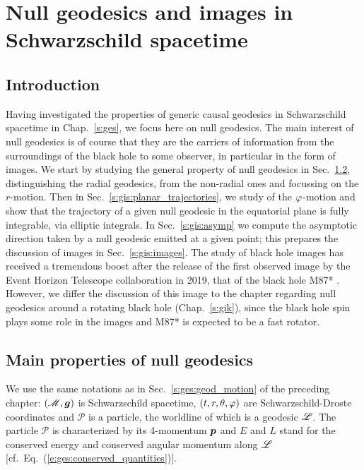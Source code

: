 \chapter{Null geodesics and images in Schwarzschild spacetime}
\label{s:gis}

\minitoc

\section{Introduction} \label{s:gis:intro}

Having investigated the properties of generic causal geodesics
in Schwarzschild spacetime in Chap.~\ref{s:ges}, we focus here on null
geodesics. The main interest of null geodesics is of course that they are
the carriers of information from the surroundings of the black hole to some
observer, in particular in the form of images.
We start by studying the general property of null geodesics in
Sec.~\ref{s:gis:null}, distinguishing the radial geodesics, from the non-radial
ones and focussing on the $r$-motion. Then in Sec.~\ref{s:gis:planar_trajectories},
we study of the $\varphi$-motion and show that the trajectory of a given
null geodesic in the equatorial plane is fully integrable, via elliptic integrals.
In Sec.~\ref{s:gis:asymp} we compute the asymptotic direction taken by a
null geodesic emitted at a given point; this prepares the discussion of
images in Sec.~\ref{s:gis:images}.
The study of black hole images has received a tremendous boost after the release of the first observed image by the Event Horizon Telescope collaboration in 2019, that of the black hole M87* \cite{EHT19a}.
However, we differ the discussion of this image to the chapter regarding null
geodesics around a rotating black hole (Chap.~\ref{s:gik}), since the black hole
spin plays some role in the images and M87* is expected to be a fast rotator.




\section{Main properties of null geodesics} \label{s:gis:null}

We use the same notations as in Sec.~\ref{s:ges:geod_motion} of the preceding
chapter: $(\mathscr{M}, \bm{g})$ is Schwarzschild spacetime, $(t,r,\theta,\varphi)$ are
Schwarzschild-Droste coordinates and
$\mathscr{P}$ is a particle, the worldline of which is a
geodesic $\mathscr{L}$. The particle $\mathscr{P}$ is characterized by its
4-momentum $\bm{p}$ and
$E$ and $L$ stand for the conserved energy and conserved angular momentum
along $\mathscr{L}$ [cf.~Eq.~(\ref{e:ges:conserved_quantities})].


